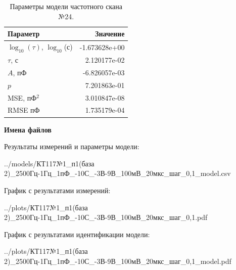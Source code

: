 \begin{table}[!ht]
    \centering
    \caption{Параметры модели частотного скана №24.}
    \begin{tabular}{|l|r|}
        \hline
        Параметр                                       & Значение                  \\ \hline
        $\log_{10}(\tau)$, $\log_{10}$(с)              & -1.673628e+00             \\ \hline
        $\tau$, с                                      & 2.120177e-02              \\ \hline
        $A$, пФ                                        & -6.826057e-03             \\ \hline
        $p$                                            & 7.201863e-01              \\ \hline
        MSE, пФ$^2$                                    & 3.010847e-08              \\ \hline
        RMSE пФ                                        & 1.735179e-04              \\ \hline
    \end{tabular}
    \label{table:frequency_scan_model_24}
\end{table}

\textbf{Имена файлов}

Результаты измерений и параметры модели:

\scriptsize../models/КТ117№1\_п1(база 2)\_2500Гц-1Гц\_1пФ\_-10С\_-3В-9В\_100мВ\_20мкс\_шаг\_0,1\_model.csv
\normalsize

График с результатами измерений:

\scriptsize../plots/КТ117№1\_п1(база 2)\_2500Гц-1Гц\_1пФ\_-10С\_-3В-9В\_100мВ\_20мкс\_шаг\_0,1.pdf
\normalsize

График с результатами идентификации модели:

\scriptsize../plots/КТ117№1\_п1(база 2)\_2500Гц-1Гц\_1пФ\_-10С\_-3В-9В\_100мВ\_20мкс\_шаг\_0,1\_model.pdf
\normalsize

